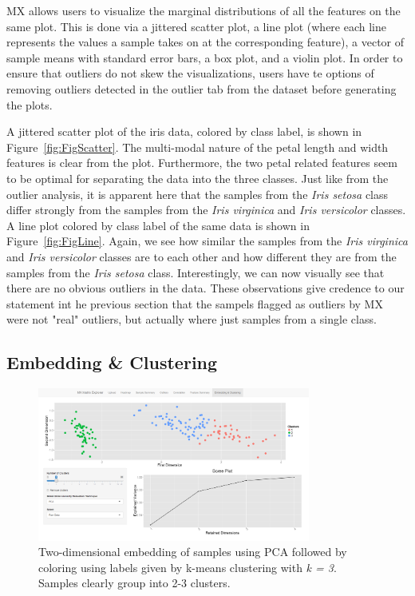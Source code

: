 \documentclass[12pt]{article}
\begin{document}
MX allows users to visualize the marginal distributions of all the features on the same plot. This is done via a jittered scatter plot, a line plot (where each line represents the values a sample takes on at the corresponding feature), a vector of sample means with standard error bars, a box plot, and a violin plot. In order to ensure that outliers do not skew the visualizations, users have te options of removing outliers detected in the outlier tab from the dataset before generating the plots. 

A jittered scatter plot of the iris data, colored by class label, is shown in Figure~\ref{fig:FigScatter}. The multi-modal nature of the petal length and width features is clear from the plot. Furthermore, the two petal related features seem to be optimal for separating the data into the three classes. Just like from the outlier analysis, it is apparent here that the samples from the \textit{Iris setosa} class differ strongly from the samples from the \textit{Iris virginica} and \textit{Iris versicolor} classes. A line plot colored by class label of the same data is shown in Figure~\ref{fig:FigLine}. Again, we see how similar the samples from the \textit{Iris virginica} and \textit{Iris versicolor} classes are to each other and how different they are from the samples from the \textit{Iris setosa} class. Interestingly, we can now visually see that there are no obvious outliers in the data. These observations give credence to our statement int he previous section that the sampels flagged as outliers by MX were not "real" outliers, but actually where just samples from a single class.

\subsection{Embedding \& Clustering}
\label{subsec:SubSecEmbedding}

\begin{figure}[t!]
	\centering
	\includegraphics[width=0.8\textwidth]{Figures/Iris/Embed_Raw.png}
	\caption{Two-dimensional embedding of samples using PCA followed by coloring using labels given by k-means clustering with \textit{k = 3}. Samples clearly group into 2-3 clusters.}
	\label{fig:FigEmbedding}
\end{figure}
\end{document}
